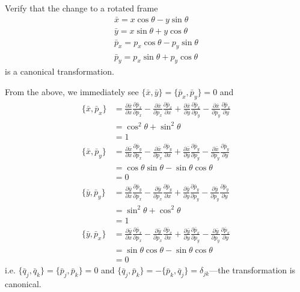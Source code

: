 \documentclass[../principles-of-quantum-mechanics.tex]{subfiles}
\begin{document}
\begin{questions}
		\question Verify that the change to a rotated frame
		\begin{gather*}
			\bar{x} = x\cos\theta - y\sin\theta \\
			\bar{y} = x\sin\theta + y\cos\theta \\
			\bar{p}_x = p_x\cos\theta - p_y\sin\theta \\
			\bar{p}_y = p_x\sin\theta + p_y\cos\theta
		\end{gather*}
		is a canonical transformation.
		
		\begin{solution}
			From the above, we immediately see $\{\bar{x}, \bar{y}\} = \{\bar{p}_x, \bar{p}_y\} = 0$ and
			\begin{align*}
				\{\bar{x}, \bar{p}_x\} &= \frac{\partial\bar{x}}{\partial{x}}\frac{\partial\bar{p}_x}{\partial p_x} - \frac{\partial\bar{x}}{\partial{p_x}}\frac{\partial\bar{p}_x}{\partial x} + \frac{\partial\bar{x}}{\partial{y}}\frac{\partial\bar{p}_x}{\partial p_y} - \frac{\partial\bar{x}}{\partial{p_y}}\frac{\partial\bar{p}_x}{\partial y}  \\
				&= \cos^2\theta + \sin^2\theta \\
				&= 1 \\
				\{\bar{x}, \bar{p}_y\} &= \frac{\partial\bar{x}}{\partial{x}}\frac{\partial\bar{p}_y}{\partial p_x} - \frac{\partial\bar{x}}{\partial{p_x}}\frac{\partial\bar{p}_y}{\partial x} + \frac{\partial\bar{x}}{\partial{y}}\frac{\partial\bar{p}_y}{\partial p_y} - \frac{\partial\bar{x}}{\partial{p_y}}\frac{\partial\bar{p}_y}{\partial y}  \\
				&= \cos\theta\sin\theta - \sin\theta\cos\theta \\
				&= 0 \\
				\{\bar{y}, \bar{p}_y\} &= \frac{\partial\bar{y}}{\partial{x}}\frac{\partial\bar{p}_y}{\partial p_x} - \frac{\partial\bar{y}}{\partial{p_x}}\frac{\partial\bar{p}_y}{\partial x} + \frac{\partial\bar{y}}{\partial{y}}\frac{\partial\bar{p}_y}{\partial p_y} - \frac{\partial\bar{y}}{\partial{p_y}}\frac{\partial\bar{p}_y}{\partial y}  \\
				&= \sin^2\theta + \cos^2\theta \\
				&= 1 \\
				\{\bar{y}, \bar{p}_x\} &= \frac{\partial\bar{y}}{\partial{x}}\frac{\partial\bar{p}_x}{\partial p_x} - \frac{\partial\bar{y}}{\partial{p_x}}\frac{\partial\bar{p}_x}{\partial x} + \frac{\partial\bar{y}}{\partial{y}}\frac{\partial\bar{p}_x}{\partial p_y} - \frac{\partial\bar{y}}{\partial{p_y}}\frac{\partial\bar{p}_x}{\partial y}  \\
				&= \sin\theta\cos\theta - \sin\theta\cos\theta \\
				&= 0
			\end{align*}
			i.e. $\{\bar{q}_j, \bar{q}_k\} = \{\bar{p}_j, \bar{p}_k\} = 0$ and $\{\bar{q}_j, \bar{p}_k\} = -\{\bar{p}_k, \bar{q}_j\} = \delta_{jk}$---the transformation is canonical.
		\end{solution}
		

\end{questions}
\end{document}
